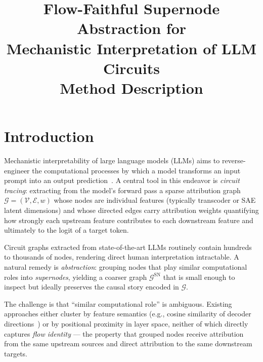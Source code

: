 \documentclass[11pt]{article}
\title{\textbf{Flow-Faithful Supernode Abstraction for\\
Mechanistic Interpretation of LLM Circuits}\\[0.5em]
\large Method Description}
\author{}
\date{}
\newcommand{\cG}{\mathcal{G}}
\newcommand{\cV}{\mathcal{V}}
\newcommand{\cE}{\mathcal{E}}
\newcommand{\1}{\mathbbm{1}}
\begin{document}
\maketitle
\tableofcontents
\newpage

\section{Introduction}
\label{sec:intro}

Mechanistic interpretability of large language models (LLMs) aims to reverse-engineer the computational processes by which a model transforms an input prompt into an output prediction~\citep{elhage2021mathematical, wang2022interpretability}.
A central tool in this endeavor is \emph{circuit tracing}: extracting from the model's forward pass a sparse attribution graph $\cG = (\cV, \cE, w)$ whose nodes are individual features (typically transcoder or SAE latent dimensions) and whose directed edges carry attribution weights quantifying how strongly each upstream feature contributes to each downstream feature and ultimately to the logit of a target token.

Circuit graphs extracted from state-of-the-art LLMs routinely contain hundreds to thousands of nodes, rendering direct human interpretation intractable.
A natural remedy is \emph{abstraction}: grouping nodes that play similar computational roles into \emph{supernodes}, yielding a coarser graph $\cG^{\mathrm{SN}}$ that is small enough to inspect but ideally preserves the causal story encoded in $\cG$.

The challenge is that ``similar computational role'' is ambiguous.
Existing approaches either cluster by feature semantics (e.g., cosine similarity of decoder directions~\citep{cunningham2023sparse}) or by positional proximity in layer space, neither of which directly captures \emph{flow identity} --- the property that grouped nodes receive attribution from the same upstream sources and direct attribution to the same downstream targets.
\end{document}
